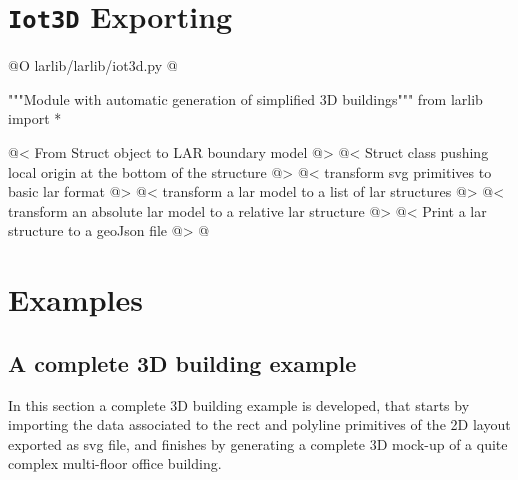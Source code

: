\documentclass[11pt,oneside]{article}	%
\begin{document}
\section{\texttt{Iot3D} Exporting}

@O larlib/larlib/iot3d.py
@{"""Module with automatic generation of simplified 3D buildings"""
from larlib import *

@< From Struct object to LAR boundary model @>
@< Struct class pushing local origin at the bottom of the structure @>
@< transform svg primitives to basic lar format @>
@< transform a lar model to a list of lar structures @>
@< transform an absolute lar model to a relative lar structure @>
@< Print a lar structure to a geoJson file @>
@}


\section{Examples}

\subsection{A complete 3D building example}

In this section a complete 3D building example is developed, that starts by importing the data associated to the rect and polyline primitives of the 2D layout exported as svg file, and finishes by generating a complete 3D mock-up of a quite complex multi-floor office building.
\end{document}

